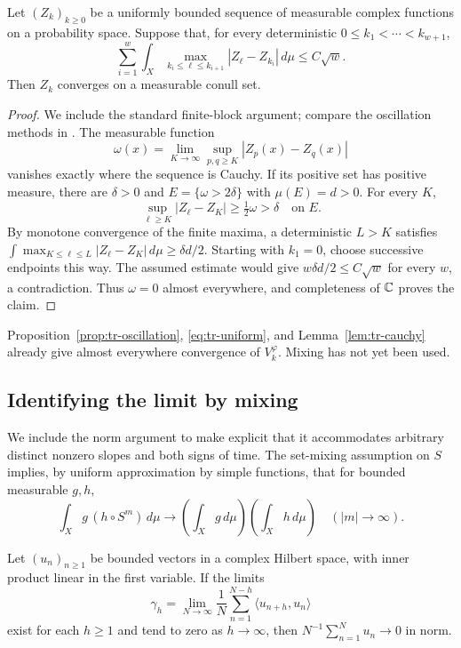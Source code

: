 \begin{lemma}
\label{lem:tr-cauchy}
Let \((Z_k)_{k\geq0}\) be a uniformly bounded sequence of measurable
complex functions on a probability space.  Suppose that, for every
deterministic \(0\leq k_1<\cdots<k_{w+1}\),
\[
 \sum_{i=1}^w\int_X
  \max_{k_i\leq\ell\leq k_{i+1}}|Z_\ell-Z_{k_i}|\,d\mu
 \leq C\sqrt w.
\]
Then \(Z_k\) converges on a measurable conull set.
\end{lemma}

\begin{proof}
We include the standard finite-block argument; compare the oscillation
methods in \cite{Bourgain,JKRW}.
The measurable function
\[
 \omega(x)=\lim_{K\to\infty}\sup_{p,q\geq K}|Z_p(x)-Z_q(x)|
\]
vanishes exactly where the sequence is Cauchy.  If its positive set
has positive measure, there are \(\delta>0\) and
\(E=\{\omega>2\delta\}\) with \(\mu(E)=d>0\).  For every \(K\),
\[
 \sup_{\ell\geq K}|Z_\ell-Z_K|
 \geq\tfrac12\omega>\delta\quad\text{on }E.
\]
By monotone convergence of the finite maxima, a deterministic
\(L>K\) satisfies
\(\int\max_{K\leq\ell\leq L}|Z_\ell-Z_K|\,d\mu\geq\delta d/2\).
Starting with \(k_1=0\), choose successive endpoints this way.
The assumed estimate would give \(w\delta d/2\leq C\sqrt w\)
for every \(w\), a contradiction.  Thus \(\omega=0\) almost
everywhere, and completeness of \(\mathbb C\) proves the claim.
\end{proof}

Proposition~\ref{prop:tr-oscillation}, \eqref{eq:tr-uniform}, and
Lemma~\ref{lem:tr-cauchy} already give almost everywhere convergence
of \(V_k^\varphi\).  Mixing has not yet been used.

\subsection{Identifying the limit by mixing}

We include the norm argument to make explicit that it accommodates
arbitrary distinct nonzero slopes and both signs of time.
The set-mixing assumption on \(S\) implies, by uniform approximation
by simple functions, that for bounded measurable \(g,h\),
\begin{equation}
 \int_Xg\,(h\circ S^m)\,d\mu
 \longrightarrow\left(\int_Xg\,d\mu\right)
                 \left(\int_Xh\,d\mu\right)
 \quad(|m|\to\infty).
 \label{eq:tr-functional-mixing}
\end{equation}

\begin{lemma}
\label{lem:tr-vdc}
Let \((u_n)_{n\geq1}\) be bounded vectors in a complex Hilbert space,
with inner product linear in the first variable.  If the limits
\[
 \gamma_h=\lim_{N\to\infty}\frac1N
            \sum_{n=1}^{N-h}\langle u_{n+h},u_n\rangle
\]
exist for each \(h\geq1\) and tend to zero as \(h\to\infty\), then
\(N^{-1}\sum_{n=1}^Nu_n\to0\) in norm.
\end{lemma}

